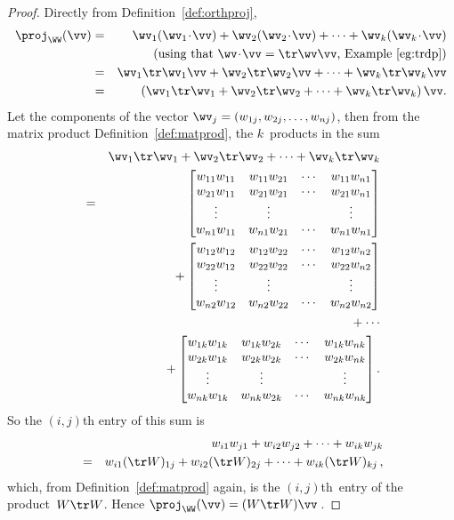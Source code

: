 \begin{proof} 
Directly from Definition~\ref{def:orthproj},
\begin{eqnarray*}
\proj_\WW(\vv)&=&\wv_1(\wv_1\cdot\vv)+\wv_2(\wv_2\cdot\vv)+\cdots+\wv_k(\wv_k\cdot\vv)
\\&&(\text{using that \(\wv\cdot\vv=\tr\wv\vv\), Example~\ref{eg:trdp}})
\\&=&\wv_1\tr\wv_1\vv+\wv_2\tr\wv_2\vv+\cdots+\wv_k\tr\wv_k\vv
\\&=&\left(\wv_1\tr\wv_1+\wv_2\tr\wv_2+\cdots+\wv_k\tr\wv_k\right)\vv.
\end{eqnarray*}
Let the components of the vector \(\wv_j=(w_{1j},w_{2j},\ldots,w_{nj})\), then from the matrix product Definition~\ref{def:matprod}, the \(k\)~products in the sum 
\def\ww#1{\begin{bmatrix} 
w_{1#1}w_{1#1}& w_{1#1}w_{2#1}&\cdots& w_{1#1}w_{n#1} \\
w_{2#1}w_{1#1}& w_{2#1}w_{2#1}&\cdots& w_{2#1}w_{n#1} \\
\vdots&\vdots&&\vdots\\
w_{n#1}w_{1#1}& w_{n#1}w_{2#1}&\cdots& w_{n#1}w_{n#1} 
\end{bmatrix}}
\begin{eqnarray*}
&&\wv_1\tr\wv_1+\wv_2\tr\wv_2+\cdots+\wv_k\tr\wv_k
\\&=& \ww1
\\&&{}+\ww2
\\&&{}+\cdots
\\&&{}+\ww k.
\end{eqnarray*}
So the \((i,j)\)th entry of this sum is
\begin{eqnarray*}
&&w_{i1}w_{j1}+w_{i2}w_{j2}+\cdots+w_{ik}w_{jk}
\\&=&w_{i1}(\tr W)_{1j}+w_{i2}(\tr W)_{2j}+\cdots+w_{ik}(\tr W)_{kj} \,,
\end{eqnarray*}
which, from Definition~\ref{def:matprod} again, is the \((i,j)\)th~entry of the product~\(W\tr W\).
Hence \(\proj_\WW(\vv)=(W\tr W)\vv\)\,.
\end{proof}



